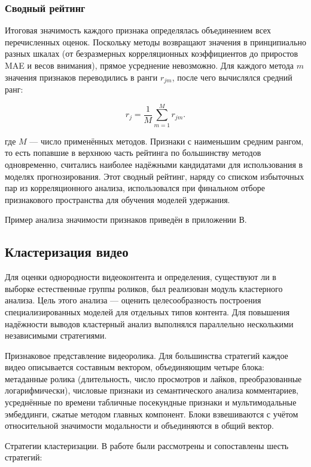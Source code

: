 \documentclass[times]{itmo-student-thesis}
\begin{document}
\subsubsection{Сводный рейтинг}

Итоговая значимость каждого признака определялась объединением всех перечисленных оценок. Поскольку методы возвращают значения в принципиально разных шкалах (от безразмерных корреляционных коэффициентов до приростов MAE и весов внимания), прямое усреднение невозможно. Для каждого метода $m$ значения признаков переводились в ранги $r_{jm}$, после чего вычислялся средний ранг:

\[
r_j=\frac{1}{M}\sum_{m=1}^{M}r_{jm}.
\]

где $M$ — число применённых методов. Признаки с наименьшим средним рангом, то есть попавшие в верхнюю часть рейтинга по большинству методов одновременно, считались наиболее надёжными кандидатами для использования в моделях прогнозирования. Этот сводный рейтинг, наряду со списком избыточных пар из корреляционного анализа, использовался при финальном отборе признакового пространства для обучения моделей удержания.

Пример анализа значимости признаков приведён в приложении В.

\subsection{Кластеризация видео}

Для оценки однородности видеоконтента и определения, существуют ли в выборке естественные группы роликов, был реализован модуль кластерного анализа. Цель этого анализа — оценить целесообразность построения специализированных моделей для отдельных типов контента. Для повышения надёжности выводов кластерный анализ выполнялся параллельно несколькими независимыми стратегиями.

Признаковое представление видеоролика. Для большинства стратегий каждое видео описывается составным вектором, объединяющим четыре блока: метаданные ролика (длительность, число просмотров и лайков, преобразованные логарифмически), числовые признаки из семантического анализа комментариев, усреднённые по времени табличные посекундные признаки и мультимодальные эмбеддинги, сжатые методом главных компонент. Блоки взвешиваются с учётом относительной значимости модальности и объединяются в общий вектор.

Стратегии кластеризации. В работе были рассмотрены и сопоставлены шесть стратегий:
\end{document}
